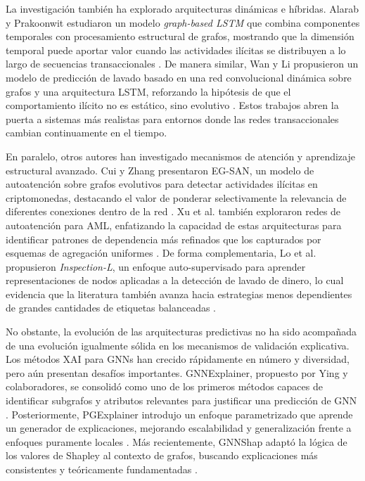 \bigskip

La investigación también ha explorado arquitecturas dinámicas e híbridas. Alarab y Prakoonwit estudiaron un modelo \textit{graph-based LSTM} que combina componentes temporales con procesamiento estructural de grafos, mostrando que la dimensión temporal puede aportar valor cuando las actividades ilícitas se distribuyen a lo largo de secuencias transaccionales \cite{Alarab2023Graph-basedData}. De manera similar, Wan y Li propusieron un modelo de predicción de lavado basado en una red convolucional dinámica sobre grafos y una arquitectura LSTM, reforzando la hipótesis de que el comportamiento ilícito no es estático, sino evolutivo \cite{Wan2024AMemory}. Estos trabajos abren la puerta a sistemas más realistas para entornos donde las redes transaccionales cambian continuamente en el tiempo.

\bigskip

En paralelo, otros autores han investigado mecanismos de atención y aprendizaje estructural avanzado. Cui y Zhang presentaron EG-SAN, un modelo de autoatención sobre grafos evolutivos para detectar actividades ilícitas en criptomonedas, destacando el valor de ponderar selectivamente la relevancia de diferentes conexiones dentro de la red \cite{Cui2024EG-SAN:Cryptocurrency}. Xu et al. también exploraron redes de autoatención para AML, enfatizando la capacidad de estas arquitecturas para identificar patrones de dependencia más refinados que los capturados por esquemas de agregación uniformes \cite{Lin2026DetectingLaundering}. De forma complementaria, Lo et al. propusieron \textit{Inspection-L}, un enfoque auto-supervisado para aprender representaciones de nodos aplicadas a la detección de lavado de dinero, lo cual evidencia que la literatura también avanza hacia estrategias menos dependientes de grandes cantidades de etiquetas balanceadas \cite{Lo2023Inspection-L:Bitcoin}.

\bigskip

No obstante, la evolución de las arquitecturas predictivas no ha sido acompañada de una evolución igualmente sólida en los mecanismos de validación explicativa. Los métodos XAI para GNNs han crecido rápidamente en número y diversidad, pero aún presentan desafíos importantes. GNNExplainer, propuesto por Ying y colaboradores, se consolidó como uno de los primeros métodos capaces de identificar subgrafos y atributos relevantes para justificar una predicción de GNN \cite{Ying2019Gnnexplainer:Networks}. Posteriormente, PGExplainer introdujo un enfoque parametrizado que aprende un generador de explicaciones, mejorando escalabilidad y generalización frente a enfoques puramente locales \cite{Luo2020ParameterizedNetwork}. Más recientemente, GNNShap adaptó la lógica de los valores de Shapley al contexto de grafos, buscando explicaciones más consistentes y teóricamente fundamentadas \cite{Akkas2024Gnnshap:Values}.

